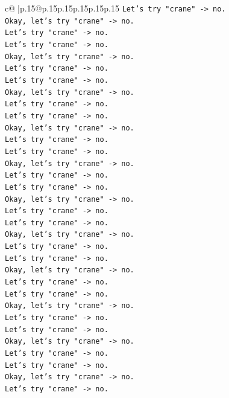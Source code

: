\documentclass{article}
\begin{document}
{\begin{supertabular}{c@{$\;$}|p{.15\linewidth}@{}p{.15\linewidth}p{.15\linewidth}p{.15\linewidth}p{.15\linewidth}p{.15\linewidth}}
{{{\texttt{Let's try "crane" {-}> no.} \\
\texttt{Okay, let's try "crane" {-}> no.} \\
\texttt{Let's try "crane" {-}> no.} \\
\texttt{Let's try "crane" {-}> no.} \\
\texttt{Okay, let's try "crane" {-}> no.} \\
\texttt{Let's try "crane" {-}> no.} \\
\texttt{Let's try "crane" {-}> no.} \\
\texttt{Okay, let's try "crane" {-}> no.} \\
\texttt{Let's try "crane" {-}> no.} \\
\texttt{Let's try "crane" {-}> no.} \\
\texttt{Okay, let's try "crane" {-}> no.} \\
\texttt{Let's try "crane" {-}> no.} \\
\texttt{Let's try "crane" {-}> no.} \\
\texttt{Okay, let's try "crane" {-}> no.} \\
\texttt{Let's try "crane" {-}> no.} \\
\texttt{Let's try "crane" {-}> no.} \\
\texttt{Okay, let's try "crane" {-}> no.} \\
\texttt{Let's try "crane" {-}> no.} \\
\texttt{Let's try "crane" {-}> no.} \\
\texttt{Okay, let's try "crane" {-}> no.} \\
\texttt{Let's try "crane" {-}> no.} \\
\texttt{Let's try "crane" {-}> no.} \\
\texttt{Okay, let's try "crane" {-}> no.} \\
\texttt{Let's try "crane" {-}> no.} \\
\texttt{Let's try "crane" {-}> no.} \\
\texttt{Okay, let's try "crane" {-}> no.} \\
\texttt{Let's try "crane" {-}> no.} \\
\texttt{Let's try "crane" {-}> no.} \\
\texttt{Okay, let's try "crane" {-}> no.} \\
\texttt{Let's try "crane" {-}> no.} \\
\texttt{Let's try "crane" {-}> no.} \\
\texttt{Okay, let's try "crane" {-}> no.} \\
\texttt{Let's try "crane" {-}> no.} \\
}}}
\end{supertabular}}
\end{document}
